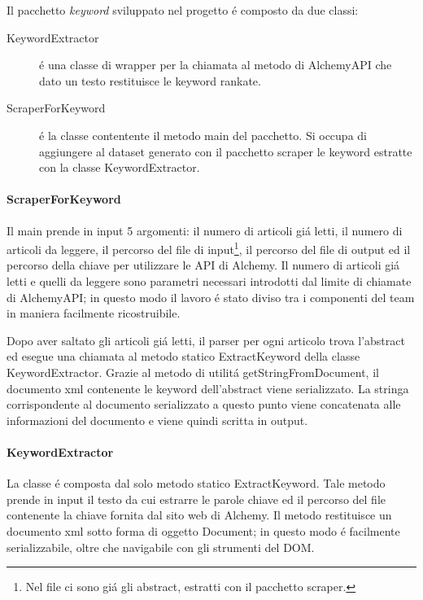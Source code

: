 \documentclass[11pt,a4paper]{article}
\begin{document}
Il pacchetto \emph{keyword} sviluppato nel progetto \'e composto da due classi:
\begin{description}
	\item[KeywordExtractor] \'e una classe di wrapper per la chiamata al metodo di AlchemyAPI che dato un testo restituisce le keyword rankate.
	\item[ScraperForKeyword] \'e la classe contentente il metodo main del pacchetto. Si occupa di aggiungere al dataset generato con il pacchetto scraper le keyword estratte con la classe KeywordExtractor.
\end{description}

\paragraph{ScraperForKeyword}
\label{par:scraperforkeyword}



Il main prende in input 5 argomenti: il numero di articoli gi\'a letti, il numero di articoli da leggere, il percorso del file di input\footnote{Nel file ci sono gi\'a gli abstract, estratti con il pacchetto scraper.}, il percorso del file di output ed il percorso della chiave per utilizzare le API di Alchemy. Il numero di articoli gi\'a letti e quelli da leggere sono parametri necessari introdotti dal limite di chiamate di AlchemyAPI; in questo modo il lavoro \'e stato diviso tra i componenti del team in maniera facilmente ricostruibile.

Dopo aver saltato gli articoli gi\'a letti, il parser per ogni articolo trova l'abstract ed esegue una chiamata al metodo statico ExtractKeyword della classe KeywordExtractor. Grazie al metodo di utilit\'a getStringFromDocument, il documento xml contenente le keyword dell'abstract viene serializzato. La stringa corrispondente al documento serializzato a questo punto viene concatenata alle informazioni del documento e viene quindi scritta in output.

\paragraph{KeywordExtractor}
\label{par:keywordextractor}
La classe \'e composta dal solo metodo statico ExtractKeyword. Tale metodo prende in input il testo da cui estrarre le parole chiave ed il percorso del file contenente la chiave fornita dal sito web di Alchemy. Il metodo restituisce un documento xml sotto forma di oggetto Document; in questo modo \'e facilmente serializzabile, oltre che navigabile con gli strumenti del DOM.
\end{document}
